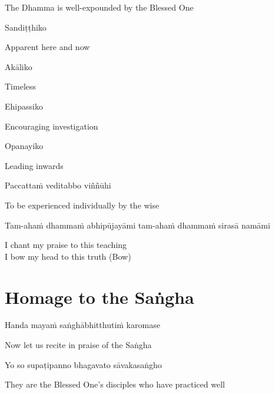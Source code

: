 \begin{cprenglish}
  The Dhamma is well-expounded by the Blessed One
\end{cprenglish}

Sandiṭṭhiko

\begin{cprenglish}
  Apparent here and now
\end{cprenglish}

Akāliko

\begin{cprenglish}
  Timeless
\end{cprenglish}

Ehipassiko

\begin{cprenglish}
  Encouraging investigation
\end{cprenglish}

Opanayiko

\begin{cprenglish}
  Leading inwards
\end{cprenglish}

Paccattaṁ veditabbo viññūhi

\begin{cprenglish}
  To be experienced individually by the wise
\end{cprenglish}

Tam-ahaṁ dhammaṁ abhipūjayāmi tam-ahaṁ dhammaṁ sirasā namāmi

\begin{cprenglish}
  I chant my praise to this teaching\\
  I bow my head to this truth (Bow)
\end{cprenglish}

\section{Homage to the Saṅgha}

\begin{leader}
  Handa mayaṁ saṅghābhitthutiṁ karomase
\end{leader}
\begin{leader}
  Now let us recite in praise of the Saṅgha
\end{leader}

Yo so supaṭipanno bhagavato sāvakasaṅgho

\begin{cprenglish}
  They are the Blessed One’s disciples who have practiced well
\end{cprenglish}

